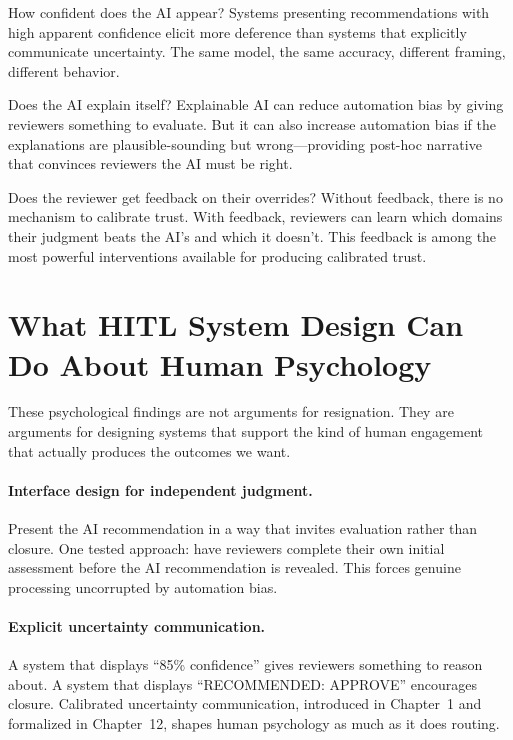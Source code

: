 How confident does the AI appear? Systems presenting recommendations with high apparent confidence elicit more deference than systems that explicitly communicate uncertainty. The same model, the same accuracy, different framing, different behavior.

Does the AI explain itself? Explainable AI can reduce automation bias by giving reviewers something to evaluate. But it can also increase automation bias if the explanations are plausible-sounding but wrong---providing post-hoc narrative that convinces reviewers the AI must be right.

Does the reviewer get feedback on their overrides? Without feedback, there is no mechanism to calibrate trust. With feedback, reviewers can learn which domains their judgment beats the AI's and which it doesn't. This feedback is among the most powerful interventions available for producing calibrated trust.

\section{What HITL System Design Can Do About Human Psychology}
\label{sec:psychology-design}

These psychological findings are not arguments for resignation. They are arguments for designing systems that support the kind of human engagement that actually produces the outcomes we want.

\paragraph{Interface design for independent judgment.} Present the AI recommendation in a way that invites evaluation rather than closure. One tested approach: have reviewers complete their own initial assessment before the AI recommendation is revealed. This forces genuine processing uncorrupted by automation bias.

\paragraph{Explicit uncertainty communication.} A system that displays ``85\% confidence'' gives reviewers something to reason about. A system that displays ``RECOMMENDED: APPROVE'' encourages closure. Calibrated uncertainty communication, introduced in Chapter~1 and formalized in Chapter~12, shapes human psychology as much as it does routing.

